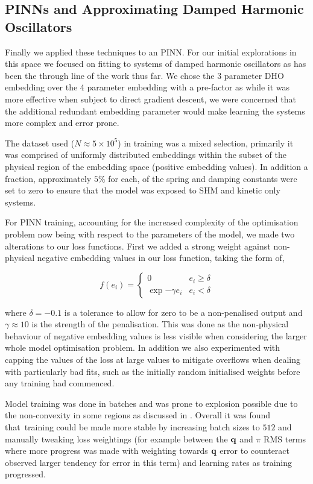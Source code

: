 \subsection{PINNs and Approximating Damped Harmonic Oscillators}

Finally we applied these techniques to an PINN. For our initial explorations in this space we focused on fitting to systems of damped harmonic oscillators as has been the through line of the work thus far. We chose the 3 parameter DHO embedding over the 4 parameter embedding with a pre-factor as while it was more effective when subject to direct gradient descent, we were concerned that the additional redundant embedding parameter would make learning the systems more complex and error prone. 

The dataset used ($N \approx 5 \times 10^5$) in training was a mixed selection, primarily it was comprised of uniformly distributed embeddings within the subset of the physical region of the embedding space (positive embedding values). In addition a fraction, approximately $5 \%$ for each, of the spring and damping constants were set to zero to ensure that the model was exposed to SHM and kinetic only systems.

For PINN training, accounting for the increased complexity of the optimisation problem now being with respect to the parameters of the model, we made two alterations to our loss functions. First we added a strong weight against non-physical negative embedding values in our loss function, taking the form of,

\begin{equation}
  f(e_i) = \begin{cases}
  	0 & e_i \ge \delta \\
  	\exp{-\gamma e_i} & e_i < \delta 
  \end{cases}
\end{equation}

where $\delta = −0.1$ is a tolerance to allow for zero to be a non-penalised output and $\gamma \approx 10$ is the strength of the penalisation. This was done as the non-physical behaviour of negative embedding values is less visible when considering the larger whole model optimisation problem.
In addition we also experimented with capping the values of the loss at large values to mitigate overflows when dealing with particularly bad fits, such as the initially random initialised weights before any training had commenced.

Model training was done in batches and was prone to explosion possible due to the non-convexity in some regions as discussed in . Overall it was found that training could be made more stable by increasing batch sizes to $512$ and manually tweaking loss weightings (for example between the $\vb q$ and $\pi$ RMS terms where more progress was made with weighting towards $\vb{q}$ error to counteract observed larger tendency for error in this term) and learning rates as training progressed.

